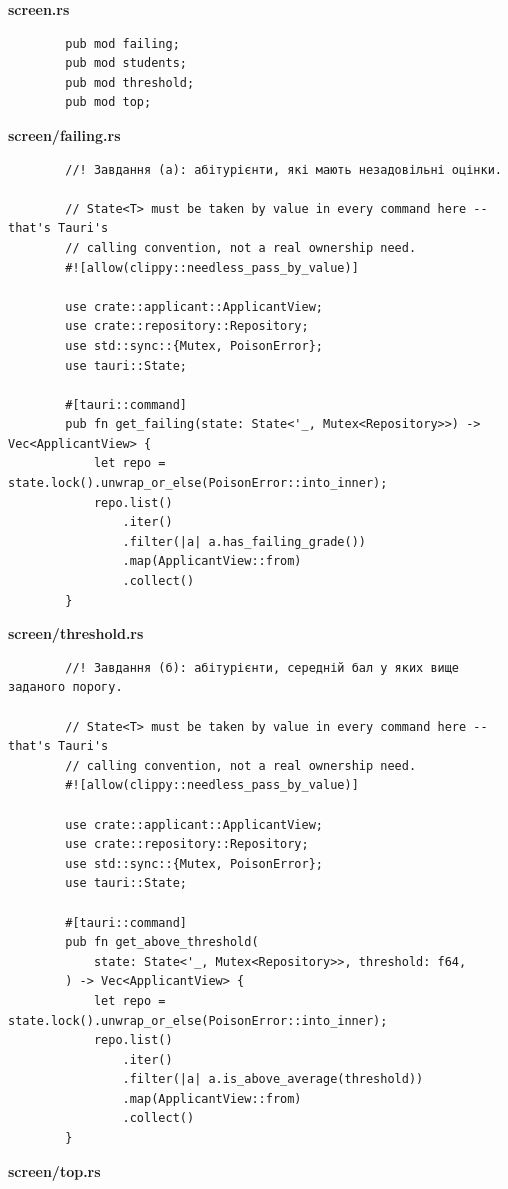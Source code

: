 \documentclass[14pt, a4paper]{extreport}
\begin{document}
	\textbf{screen.rs}

	\begin{verbatim}
		pub mod failing;
		pub mod students;
		pub mod threshold;
		pub mod top;
	\end{verbatim}

	\textbf{screen/failing.rs}

	\begin{verbatim}
		//! Завдання (a): абітурієнти, які мають незадовільні оцінки.

		// State<T> must be taken by value in every command here -- that's Tauri's
		// calling convention, not a real ownership need.
		#![allow(clippy::needless_pass_by_value)]

		use crate::applicant::ApplicantView;
		use crate::repository::Repository;
		use std::sync::{Mutex, PoisonError};
		use tauri::State;

		#[tauri::command]
		pub fn get_failing(state: State<'_, Mutex<Repository>>) -> Vec<ApplicantView> {
			let repo = state.lock().unwrap_or_else(PoisonError::into_inner);
			repo.list()
				.iter()
				.filter(|a| a.has_failing_grade())
				.map(ApplicantView::from)
				.collect()
		}
	\end{verbatim}

	\textbf{screen/threshold.rs}

	\begin{verbatim}
		//! Завдання (б): абітурієнти, середній бал у яких вище заданого порогу.

		// State<T> must be taken by value in every command here -- that's Tauri's
		// calling convention, not a real ownership need.
		#![allow(clippy::needless_pass_by_value)]

		use crate::applicant::ApplicantView;
		use crate::repository::Repository;
		use std::sync::{Mutex, PoisonError};
		use tauri::State;

		#[tauri::command]
		pub fn get_above_threshold(
			state: State<'_, Mutex<Repository>>, threshold: f64,
		) -> Vec<ApplicantView> {
			let repo = state.lock().unwrap_or_else(PoisonError::into_inner);
			repo.list()
				.iter()
				.filter(|a| a.is_above_average(threshold))
				.map(ApplicantView::from)
				.collect()
		}
	\end{verbatim}

	\textbf{screen/top.rs}
\end{document}
